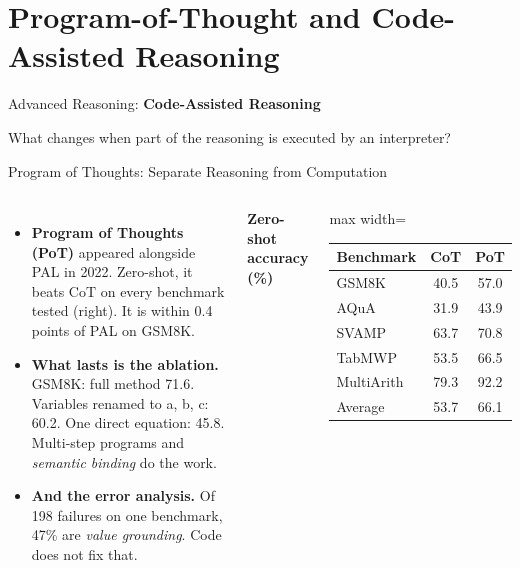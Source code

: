 \section{Program-of-Thought and Code-Assisted Reasoning}

\begin{frame}{}
    \LARGE Advanced Reasoning: \textbf{Code-Assisted Reasoning}

    \vspace{1em}
    \normalsize What changes when part of the reasoning is executed by an interpreter?
\end{frame}

\begin{frame}{Program of Thoughts: Separate Reasoning from Computation}
    \begin{columns}[T,onlytextwidth]
        \begin{itemize}\itemsep0.45em
            \item \textbf{Program of Thoughts (PoT)} appeared alongside PAL in 2022. Zero-shot, it beats CoT on every benchmark tested (right). It is within 0.4 points of PAL on GSM8K.
            \item \textbf{What lasts is the ablation.} GSM8K: full method 71.6. Variables renamed to a, b, c: 60.2. One direct equation: 45.8. Multi-step programs and \emph{semantic binding} do the work.
            \item \textbf{And the error analysis.} Of 198 failures on one benchmark, 47\% are \emph{value grounding}. Code does not fix that.
        \end{itemize}
        \centering
        \small
        \textbf{Zero-shot accuracy (\%)}

        \vspace{0.3em}
        \begin{adjustbox}{max width=\linewidth}\begin{tabular}{lcc}
            \toprule
            \textbf{Benchmark} & \textbf{CoT} & \textbf{PoT} \\
            \midrule
            GSM8K & 40.5 & 57.0 \\
            AQuA & 31.9 & 43.9 \\
            SVAMP & 63.7 & 70.8 \\
            TabMWP & 53.5 & 66.5 \\
            MultiArith & 79.3 & 92.2 \\
            \rowcolor{KAUSTcyan!12} Average & 53.7 & 66.1 \\
            \bottomrule
        \end{tabular}\end{adjustbox}
    \end{columns}
    \vspace{0.2em}
\end{frame}

